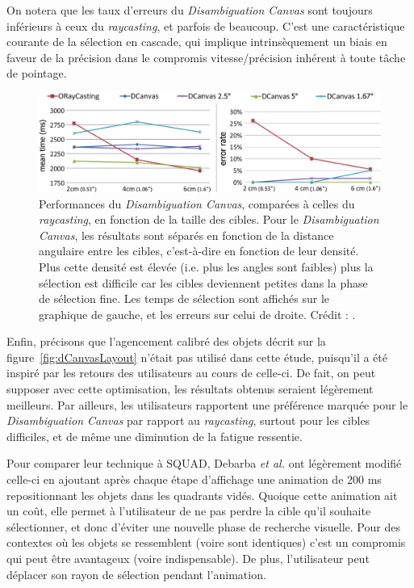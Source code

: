 	On notera que les taux d'erreurs du \emph{Disambiguation Canvas} sont toujours inférieurs à ceux du \emph{raycasting}, et parfois de beaucoup. C'est une caractéristique courante de la sélection en cascade, qui implique intrinsèquement un biais en faveur de la précision dans le compromis vitesse/précision inhérent à toute tâche de pointage.
	
	\begin{figure}[!htb]
		\centering
		\includegraphics[width=\textwidth]{figures/ch2/dCanvasRCPerf}
		\caption[\emph{Disambiguation Canvas} -- performances I]{Performances du \emph{Disambiguation Canvas}, comparées à celles du \emph{raycasting}, en fonction de la taille des cibles. Pour le \emph{Disambiguation Canvas}, les résultats sont séparés en fonction de la distance angulaire entre les cibles, c'est-à-dire en fonction de leur densité. Plus cette densité est élevée (i.e. plus les angles sont faibles) plus la sélection est difficile car les cibles deviennent petites dans la phase de sélection fine. Les temps de sélection sont affichés sur le graphique de gauche, et les erreurs sur celui de droite. Crédit : \cite{debarba2013disambiguation}.}
		\label{fig:dCanvasRCPerf}
	\end{figure}

	Enfin, précisons que l'agencement calibré des objets décrit sur la figure~\ref{fig:dCanvasLayout} n'était pas utilisé dans cette étude, puisqu'il a été inspiré par les retours des utilisateurs au cours de celle-ci. De fait, on peut supposer avec cette optimisation, les résultats obtenus seraient légèrement meilleurs. Par ailleurs, les utilisateurs rapportent une préférence marquée pour le \emph{Disambiguation Canvas} par rapport au \emph{raycasting}, surtout pour les cibles difficiles, et de même une diminution de la fatigue ressentie.
	
	Pour comparer leur technique à SQUAD, Debarba \emph{et al.} ont légèrement modifié celle-ci en ajoutant après chaque étape \og d'affichage \fg{} une animation de 200 ms repositionnant les objets dans les quadrants vidés. Quoique cette animation ait un coût, elle permet à l'utilisateur de ne pas perdre la cible qu'il souhaite sélectionner, et donc d'éviter une nouvelle phase de recherche visuelle. Pour des contextes où les objets se ressemblent (voire sont identiques) c'est un compromis qui peut être avantageux (voire indispensable). De plus, l'utilisateur peut déplacer son rayon de sélection pendant l'animation.
	
